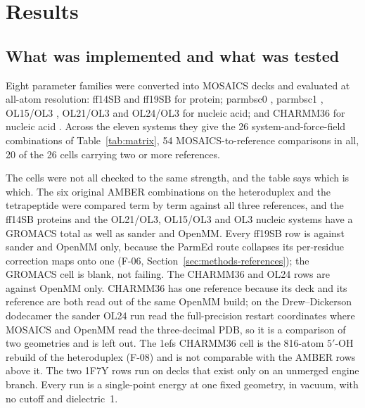 \section{Results}
\label{sec:results}

\subsection{What was implemented and what was tested}
\label{sec:coverage}

Eight parameter families were converted into MOSAICS decks and evaluated at
all-atom resolution: ff14SB \cite{maier2015ff14sb} and ff19SB
\cite{tian2020ff19sb} for protein; parmbsc0 \cite{perez2007bsc0}, parmbsc1
\cite{ivani2016bsc1}, OL15/OL3 \cite{zgarbova2015ol15,zgarbova2011ol3},
OL21/OL3 \cite{zgarbova2021ol21,zgarbova2011ol3} and OL24/OL3
\cite{zgarbova2025ol24,zgarbova2011ol3} for nucleic acid; and CHARMM36 for
nucleic acid \cite{hart2012charmm36dna,denning2011charmm36rna}. Across the
eleven systems they give the 26 system-and-force-field combinations of
Table~\ref{tab:matrix}, 54 MOSAICS-to-reference comparisons in all, 20 of the
26 cells carrying two or more references.

The cells were not all checked to the same strength, and the table says which
is which. The six original AMBER combinations on the heteroduplex and the
tetrapeptide were compared term by term against all three references, and the
ff14SB proteins and the OL21/OL3, OL15/OL3 and OL3 nucleic systems have a
GROMACS total as well as sander and OpenMM. Every ff19SB row is against sander
and OpenMM only, because the ParmEd route collapses its per-residue correction
maps onto one (F-06, Section~\ref{sec:methods-references}); the GROMACS cell is
blank, not failing. The CHARMM36 and OL24 rows are against OpenMM only.
CHARMM36 has one reference because its deck and its reference are both read
out of the same OpenMM build; on the Drew--Dickerson dodecamer the sander OL24
run read the full-precision restart coordinates where MOSAICS and OpenMM read
the three-decimal PDB, so it is a comparison of two geometries and is left out.
The 1efs CHARMM36 cell is the 816-atom $5'$-OH rebuild of the heteroduplex
(F-08) and is not comparable with the AMBER rows above it. The two 1F7Y rows
run on decks that exist only on an unmerged engine branch. Every run is a
single-point energy at one fixed geometry, in vacuum, with no cutoff and
dielectric~1.


